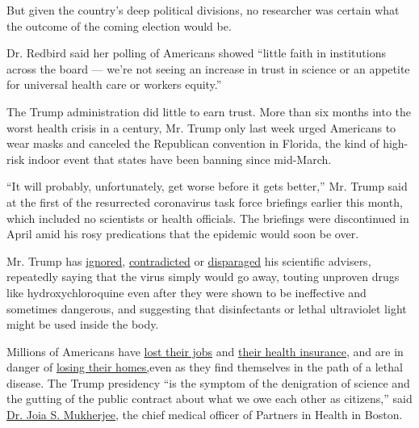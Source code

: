 But given the country's deep political divisions, no researcher was
certain what the outcome of the coming election would be.

Dr. Redbird said her polling of Americans showed ``little faith in
institutions across the board --- we're not seeing an increase in trust
in science or an appetite for universal health care or workers equity.''

The Trump administration did little to earn trust. More than six months
into the worst health crisis in a century, Mr. Trump only last week
urged Americans to wear masks and canceled the Republican convention in
Florida, the kind of high-risk indoor event that states have been
banning since mid-March.

``It will probably, unfortunately, get worse before it gets better,''
Mr. Trump said at the first of the resurrected coronavirus task force
briefings earlier this month, which included no scientists or health
officials. The briefings were discontinued in April amid his rosy
predications that the epidemic would soon be over.

Mr. Trump has
\href{https://www.nytimes.com/2020/03/23/us/politics/coronavirus-trump-fauci.html}{ignored},
\href{https://www.youtube.com/watch?v=yYhriqvJMSw}{contradicted} or
\href{https://www.cnn.com/2020/07/19/politics/trump-fauci-alarmist-coronavirus/index.html}{disparaged}
his scientific advisers, repeatedly saying that the virus simply would
go away, touting unproven drugs like hydroxychloroquine even after they
were shown to be ineffective and sometimes dangerous, and suggesting
that disinfectants or lethal ultraviolet light might be used inside the
body.

Millions of Americans have
\href{https://www.nytimes.com/live/2020/07/23/business/stock-market-today-coronavirus\#roughly-one-in-five-workers-are-collecting-unemployment-benefits}{lost
their jobs} and
\href{https://www.nytimes.com/2020/07/13/us/politics/coronavirus-health-insurance-trump.html}{their
health insurance}, and are in danger of
\href{https://www.nytimes.com/2020/07/23/opinion/coronavirus-evictions-rent.html}{losing
their homes,}even as they find themselves in the path of a lethal
disease. The Trump presidency ``is the symptom of the denigration of
science and the gutting of the public contract about what we owe each
other as citizens,'' said
\href{https://ghsm.hms.harvard.edu/faculty-staff/joia-stapleton-mukherjee}{Dr.
Joia S. Mukherjee}, the chief medical officer of Partners in Health in
Boston.

